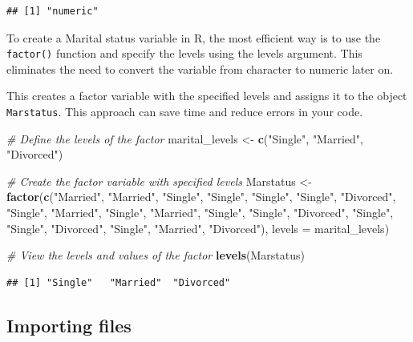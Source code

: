\documentclass[
]{article}
\newenvironment{Shaded}{\begin{snugshade}}{\end{snugshade}}
\newcommand{\AttributeTok}[1]{\textcolor[rgb]{0.13,0.29,0.53}{#1}}
\newcommand{\CommentTok}[1]{\textcolor[rgb]{0.56,0.35,0.01}{\textit{#1}}}
\newcommand{\FunctionTok}[1]{\textcolor[rgb]{0.13,0.29,0.53}{\textbf{#1}}}
\newcommand{\NormalTok}[1]{#1}
\newcommand{\OtherTok}[1]{\textcolor[rgb]{0.56,0.35,0.01}{#1}}
\newcommand{\StringTok}[1]{\textcolor[rgb]{0.31,0.60,0.02}{#1}}
\begin{document}
\begin{verbatim}
## [1] "numeric"
\end{verbatim}

To create a Marital status variable in R, the most efficient way is to
use the \texttt{factor()} function and specify the levels using the
levels argument. This eliminates the need to convert the variable from
character to numeric later on.

This creates a factor variable with the specified levels and assigns it
to the object \texttt{Marstatus}. This approach can save time and reduce
errors in your code.

\begin{Shaded}
\begin{Highlighting}[]
\CommentTok{\# Define the levels of the factor}
\NormalTok{marital\_levels }\OtherTok{\textless{}{-}} \FunctionTok{c}\NormalTok{(}\StringTok{"Single"}\NormalTok{, }\StringTok{"Married"}\NormalTok{, }\StringTok{"Divorced"}\NormalTok{)}

\CommentTok{\# Create the factor variable with specified levels}
\NormalTok{Marstatus }\OtherTok{\textless{}{-}} \FunctionTok{factor}\NormalTok{(}\FunctionTok{c}\NormalTok{(}\StringTok{"Married"}\NormalTok{, }\StringTok{"Married"}\NormalTok{, }\StringTok{"Single"}\NormalTok{, }\StringTok{"Single"}\NormalTok{, }\StringTok{"Single"}\NormalTok{, }\StringTok{"Single"}\NormalTok{, }\StringTok{"Divorced"}\NormalTok{, }\StringTok{"Single"}\NormalTok{, }\StringTok{"Married"}\NormalTok{, }\StringTok{"Single"}\NormalTok{, }\StringTok{"Married"}\NormalTok{, }\StringTok{"Single"}\NormalTok{, }\StringTok{"Single"}\NormalTok{, }\StringTok{"Divorced"}\NormalTok{, }\StringTok{"Single"}\NormalTok{, }\StringTok{"Single"}\NormalTok{, }\StringTok{"Divorced"}\NormalTok{, }\StringTok{"Single"}\NormalTok{, }\StringTok{"Married"}\NormalTok{, }\StringTok{"Divorced"}\NormalTok{), }\AttributeTok{levels =}\NormalTok{ marital\_levels)}

\CommentTok{\# View the levels and values of the factor}
\FunctionTok{levels}\NormalTok{(Marstatus)}
\end{Highlighting}
\end{Shaded}

\begin{verbatim}
## [1] "Single"   "Married"  "Divorced"
\end{verbatim}

\hypertarget{importing-files}{%
\subsection{Importing files}\label{importing-files}}
\end{document}
